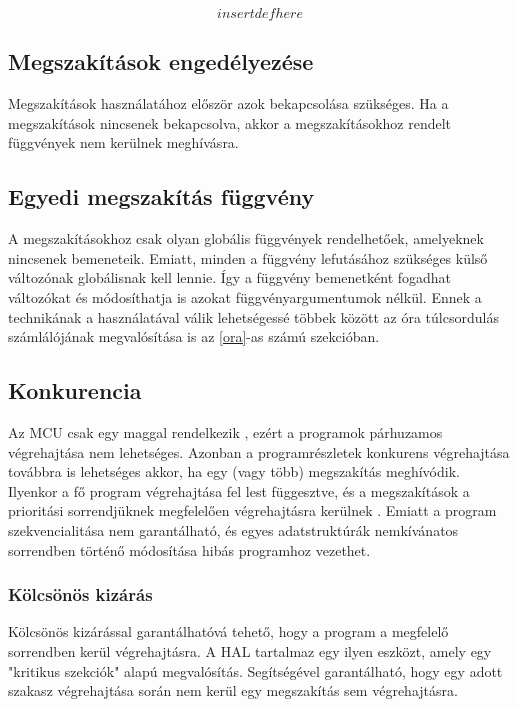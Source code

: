 \[insert def here\]
\subsection{Megszakítások engedélyezése}
Megszakítások használatához először azok bekapcsolása szükséges. Ha a megszakítások nincsenek bekapcsolva, akkor a megszakításokhoz rendelt függvények nem kerülnek meghívásra.

\subsection{Egyedi megszakítás függvény}
A megszakításokhoz csak olyan globális függvények rendelhetőek, amelyeknek nincsenek bemeneteik. Emiatt, minden a függvény lefutásához szükséges külső változónak globálisnak kell lennie.
Így a függvény bemenetként fogadhat változókat és módosíthatja is azokat függvényargumentumok nélkül. Ennek a technikának a használatával válik lehetségessé többek között az óra túlcsordulás számlálójának megvalósítása is az \ref{ora}-as számú szekcióban. 

\subsection{Konkurencia}
Az MCU csak egy maggal rendelkezik \cite{ATmega_processor_datasheet}, ezért a programok párhuzamos végrehajtása nem lehetséges.
Azonban a programrészletek konkurens végrehajtása továbbra is lehetséges akkor, ha egy (vagy több) megszakítás meghívódik.
Ilyenkor a fő program végrehajtása fel lest függesztve, és a megszakítások a prioritási sorrendjüknek megfelelően végrehajtásra kerülnek \cite{ATmega_processor_datasheet}.
Emiatt a program szekvencialitása nem garantálható, és egyes adatstruktúrák nemkívánatos sorrendben történő módosítása hibás programhoz vezethet.

\subsubsection{Kölcsönös kizárás}
Kölcsönös kizárással garantálhatóvá tehető, hogy a program a megfelelő sorrendben kerül végrehajtásra.
A HAL tartalmaz egy ilyen eszközt, amely egy "kritikus szekciók" alapú megvalósítás.
Segítségével garantálható, hogy egy adott szakasz végrehajtása során nem kerül egy megszakítás sem végrehajtásra.